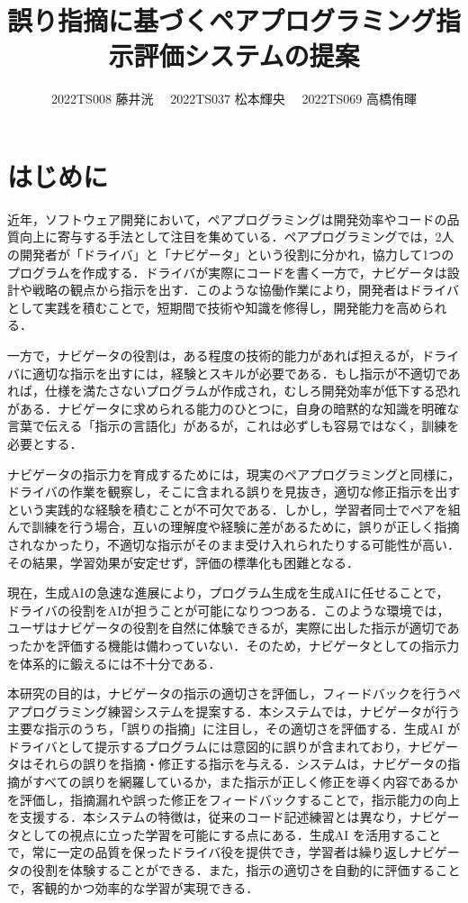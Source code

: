 \documentclass[twoside,twocolumn,10pt]{jsarticle}
\title{誤り指摘に基づくペアプログラミング指示評価システムの提案}
\author{2022TS008 藤井洸 \ \ 2022TS037 松本輝央 \ \ 2022TS069 高橋侑暉}
\begin{document}
\maketitle

\section{はじめに}\label{sec:はじめに}
近年，ソフトウェア開発において，ペアプログラミングは開発効率やコードの品質向上に寄与する手法として注目を集めている\cite{begel2008pair}．ペアプログラミングでは，2人の開発者が「ドライバ」と「ナビゲータ」という役割に分かれ，協力して1つのプログラムを作成する．ドライバが実際にコードを書く一方で，ナビゲータは設計や戦略の観点から指示を出す．このような協働作業により，開発者はドライバとして実践を積むことで，短期間で技術や知識を修得し，開発能力を高められる．

一方で，ナビゲータの役割は，ある程度の技術的能力があれば担えるが，ドライバに適切な指示を出すには，経験とスキルが必要である．もし指示が不適切であれば，仕様を満たさないプログラムが作成され，むしろ開発効率が低下する恐れがある．ナビゲータに求められる能力のひとつに，自身の暗黙的な知識を明確な言葉で伝える「指示の言語化」があるが，これは必ずしも容易ではなく，訓練を必要とする．

ナビゲータの指示力を育成するためには，現実のペアプログラミングと同様に，ドライバの作業を観察し，そこに含まれる誤りを見抜き，適切な修正指示を出すという実践的な経験を積むことが不可欠である．しかし，学習者同士でペアを組んで訓練を行う場合，互いの理解度や経験に差があるために，誤りが正しく指摘されなかったり，不適切な指示がそのまま受け入れられたりする可能性が高い．その結果，学習効果が安定せず，評価の標準化も困難となる．

現在，生成AIの急速な進展により，プログラム生成を生成AIに任せることで，ドライバの役割をAIが担うことが可能になりつつある\cite{Surveyre96:online}．このような環境では，ユーザはナビゲータの役割を自然に体験できるが，実際に出した指示が適切であったかを評価する機能は備わっていない．そのため，ナビゲータとしての指示力を体系的に鍛えるには不十分である．

本研究の目的は，ナビゲータの指示の適切さを評価し，フィードバックを行うペアプログラミング練習システムを提案する．本システムでは，ナビゲータが行う主要な指示のうち，「誤りの指摘」に注目し，その適切さを評価する．生成AI がドライバとして提示するプログラムには意図的に誤りが含まれており，ナビゲータはそれらの誤りを指摘・修正する指示を与える．システムは，ナビゲータの指摘がすべての誤りを網羅しているか，また指示が正しく修正を導く内容であるかを評価し，指摘漏れや誤った修正をフィードバックすることで，指示能力の向上を支援する．本システムの特徴は，従来のコード記述練習とは異なり，ナビゲータとしての視点に立った学習を可能にする点にある．生成AI を活用することで，常に一定の品質を保ったドライバ役を提供でき，学習者は繰り返しナビゲータの役割を体験することができる．また，指示の適切さを自動的に評価することで，客観的かつ効率的な学習が実現できる．
\end{document}
